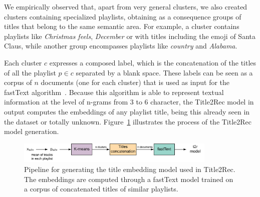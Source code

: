 We empirically observed that, apart from very general clusters, we also created clusters containing specialized playlists, obtaining as a consequence groups of titles that belong to the same semantic area. For example, a cluster contains playlists like \textit{Christmas feels}, \textit{December} or with titles including the emoji of Santa Claus, while another group encompasses playlists like \textit{country} and \textit{Alabama}.

Each cluster $c$ expresses a composed label, which is the concatenation of the titles of all the playlist $p \in c$ separated by a blank space. These labels can be seen as a corpus of $n$ documents (one for each cluster) that is used as input for the fastText algorithm~\cite{joulin2016fasttext}. Because this algorithm is able to represent textual information at the level of n-grams from 3 to 6 character, the Title2Rec model in output computes the embeddings of any playlist title, being this already seen in the dataset or totally unknown. Figure~\ref{fig:t2r_pipeline} illustrates the process of the Title2Rec model generation.

\begin{figure}
    \centering
    \includegraphics[width=0.85\textwidth]{figures/t2r.pdf}
    \caption{Pipeline for generating the title embedding model used in Title2Rec. The embeddings are computed through a fastText model trained on a corpus of concatenated titles of similar playlists.}
    \label{fig:t2r_pipeline}
\end{figure}

